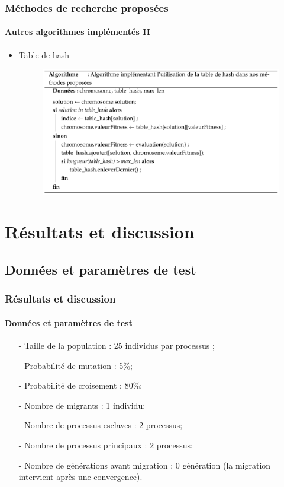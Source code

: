 \documentclass[11pt]{beamer}
\begin{document}
 \begin{frame}
 \frametitle{Méthodes de recherche proposées}
 \framesubtitle{Autres algorithmes implémentés II}
	
	\begin{itemize}
		\item Table de hash
		\begin{figure}[!h]
		\begin{center}
			\includegraphics[scale=.4
			]{img/hash_table_algo.png}
		\end{center}
 \end{figure}
	\end{itemize}
	
 \end{frame}
 
 
 
 \section{Résultats et discussion}
 \subsection{Données et paramètres de test}
 \begin{frame}
 \frametitle{Résultats et discussion}
 \framesubtitle{Données et paramètres de test}
 \begin{itemize}
					\item[-] Taille de la population : 25 individus par processus ;
			        \item[-] Probabilité de mutation : 5\%;
			        \item[-] Probabilité de croisement : 80\%;
			        \item[-] Nombre de migrants : 1 individu;
		 	        \item[-] Nombre de processus esclaves : 2 processus;
			        \item[-] Nombre de processus principaux : 2 processus;
			        \item[-] Nombre de générations avant migration : 0 génération (la migration intervient après une convergence).
				\end{itemize}
 \end{frame}
 
\end{document}

